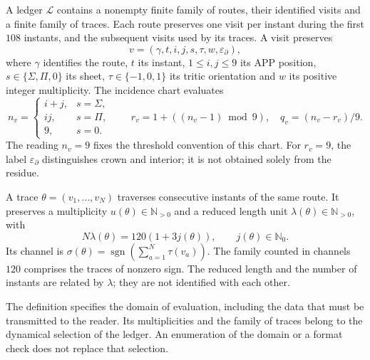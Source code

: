 \begin{definition}
\label{vi:vi:dep:libro-dominio}
A ledger \(\mathscr L\) contains a nonempty finite family of routes,
their identified visits and a finite family of traces. Each route
preserves one visit per instant during the first \(108\) instants,
and the subsequent visits used by its traces. A visit preserves
\[
 v=(\gamma,t,i,j,s,\tau,w,\varepsilon_\partial),
\]
where \(\gamma\) identifies the route, \(t\) its instant, \(1\le i,j\le9\)
its APP position, \(s\in\{\Sigma,\Pi,0\}\) its sheet,
\(\tau\in\{-1,0,1\}\) its tritic orientation and \(w\) its positive integer
multiplicity. The incidence chart evaluates
\[
 n_v=
 \begin{cases}
 i+j,&s=\Sigma,\\
 ij,&s=\Pi,\\
 9,&s=0.
 \end{cases}
 \qquad
 r_v=1+((n_v-1)\bmod9),\quad q_v=(n_v-r_v)/9.
\]
The reading \(n_v=9\) fixes the threshold convention of this chart.
For \(r_v=9\), the label \(\varepsilon_\partial\) distinguishes
crown and interior; it is not obtained solely from the residue.

A trace \(\theta=(v_1,\ldots,v_N)\) traverses consecutive instants of
the same route. It preserves a multiplicity \(u(\theta)\in\mathbb N_{>0}\)
and a reduced length unit
\(\lambda(\theta)\in\mathbb N_{>0}\), with
\[
 N\lambda(\theta)=120(1+3j(\theta)),\qquad j(\theta)\in\mathbb N_0.
\]
Its channel is
\(\sigma(\theta)=\operatorname{sgn}(\sum_{a=1}^N\tau(v_a))\).
The family counted in channels \(120\) comprises the traces of
nonzero sign. The reduced length and the number of instants are
related by \(\lambda\); they are not identified with each other.
\end{definition}

The definition specifies the domain of evaluation, including the
data that must be transmitted to the reader. Its multiplicities and the family
of traces belong to the dynamical selection of the ledger. An enumeration
of the domain or a format check does not replace that selection.


